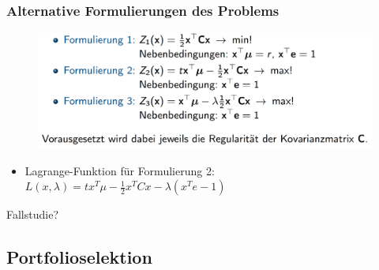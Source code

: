\documentclass[12pt]{report}
\theoremstyle{dotless}
\theoremstyle{definition}
\begin{document}
\subsubsection{Alternative Formulierungen des Problems}

\begin{figure}[H]
\centering
\includegraphics[width=\textwidth]{Bilder/alternativeFormulierungen.png}
\end{figure}

\begin{itemize}
	\item Lagrange-Funktion f\"ur Formulierung 2: \\ $L(x, \lambda) = tx^T \mu - \frac{1}{2} x^T Cx - \lambda (x^T e - 1)$ 
\end{itemize}

Fallstudie? \\

\subsection{Portfolioselektion}
\end{document}
